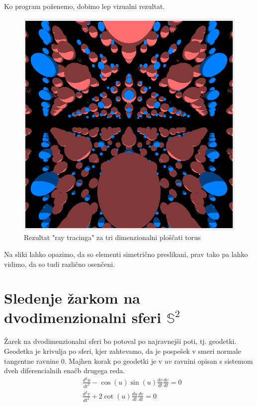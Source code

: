 \documentclass[titlepage]{article}
\begin{document}

Ko program poženemo, dobimo lep vizualni rezultat.
\begin{figure}[H]
    \centering
    \includegraphics[width=0.5\linewidth]{Images/flat_torus.png}
    \caption{Rezultat "ray tracinga" za tri dimenzionalni ploščati torus}
    \label{Slika:Rezultat "ray tracinga" za tri dimenzionalni ploščati torus}
\end{figure}
Na sliki lahko opazimo, da so elementi simetrično preslikani, prav tako pa lahko vidimo, da so tudi različno osenčeni.

\section{Sledenje žarkom na dvodimenzionalni sferi $\mathbb{S}^{2}$}
Žarek na dvodimenzionalni sferi bo potoval po najravnejši poti, tj. geodetki. Geodetka je krivulja po sferi, kjer zahtevamo, da je
pospešek v smeri normale tangentne ravnine 0. Majhen korak po geodetki je v $uv$ ravnini opisan s sistemom dveh diferencialnih enačb drugega reda.
\begin{equation}
    \begin{split}
        &\frac{d^{2}u}{dt^{2}}-\cos(u)\sin(u)\frac{dv}{dt}\frac{dv}{dt}=0 \\
        &\frac{d^{2}v}{dt^{2}}+2\cot(u)\frac{du}{dt}\frac{dv}{dt}=0
    \end{split}
\end{equation}
\end{document}
